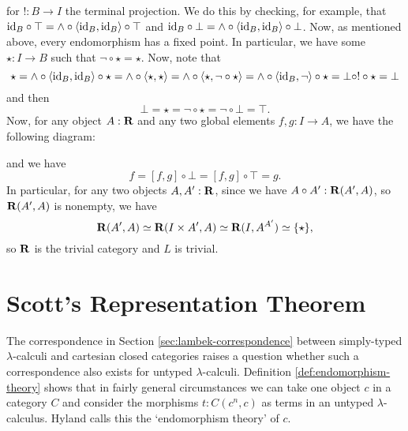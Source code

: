 for $ !: B \to I $ the terminal projection. We do this by checking, for example, that $ \text{id}_{B} \circ \top = \land \circ \langle \text{id}_{B}, \text{id}_{B} \rangle \circ \top $ and $ \text{id}_{B} \circ \bot = \land \circ \langle \text{id}_{B}, \text{id}_{B} \rangle \circ \bot $. Now, as mentioned above, every endomorphism has a fixed point. In particular, we have some $ \star: I \to B $ such that $ \lnot \circ \star = \star $. Now, note that
\[ \star = \land \circ \langle \text{id}_{B}, \text{id}_{B} \rangle \circ \star = \land \circ \langle \star, \star \rangle = \land \circ \langle \star, \lnot \circ \star \rangle = \land \circ \langle \text{id}_{B}, \lnot \rangle \circ \star = \bot \circ ! \circ \star = \bot \]
and then
\[ \bot = \star = \lnot \circ \star = \lnot \circ \bot = \top. \]
Now, for any object $ A: \mathbf{R} $ and any two global elements $ f, g: I \to A $, we have the following diagram:
\begin{center}
\end{center}
and we have
\[ f = [f, g] \circ \bot = [f, g] \circ \top = g. \]
In particular, for any two objects $ A, A^\prime: \mathbf{R} $, since we have $ A \circ A^\prime : \mathbf{R}(A^\prime, A) $, so $ \mathbf{R}(A^\prime, A) $ is nonempty, we have
\[ \mathbf{R}(A^\prime, A) \simeq \mathbf{R}(I \times A^\prime, A) \simeq \mathbf{R}(I, A^{A^\prime}) \simeq \{ \star \}, \]
so $ \mathbf{R} $ is the trivial category and $ L $ is trivial.

\section{Scott's Representation Theorem}
The correspondence in Section \ref{sec:lambek-correspondence} between simply-typed $ \lambda $-calculi and cartesian closed categories raises a question whether such a correspondence also exists for untyped $ \lambda $-calculi. Definition \ref{def:endomorphism-theory} shows that in fairly general circumstances we can take one object $ c $ in a category $ C $ and consider the morphisms $ t: C(c^n, c) $ as terms in an untyped $ \lambda $-calculus. Hyland calls this the `endomorphism theory' of $ c $.

